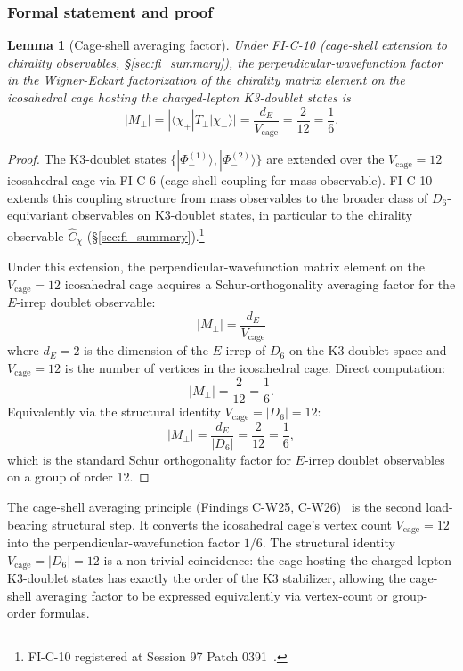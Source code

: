 \documentclass[11pt,letterpaper]{article}
\newtheorem{lemma}[theorem]{Lemma}
\newcommand{\Cchi}{\hat{C}_\chi}
\newcommand{\PhiminusOne}{|\Phi_-^{(1)}\rangle}
\newcommand{\PhiminusTwo}{|\Phi_-^{(2)}\rangle}
\newcommand{\Dsix}{D_6}
\begin{document}
\subsubsection{Formal statement and proof}\label{sec:cage_shell_factor_lemma}

\begin{lemma}[Cage-shell averaging factor]\label{lem:cage_shell}
Under FI-C-10 (cage-shell extension to chirality observables, \S\ref{sec:fi_summary}), the perpendicular-wavefunction factor in the Wigner-Eckart factorization of the chirality matrix element on the icosahedral cage hosting the charged-lepton K3-doublet states is
\[
|M_\perp| = |\langle \chi_+ | T_\perp | \chi_- \rangle| = \frac{d_E}{V_\text{cage}} = \frac{2}{12} = \frac{1}{6}.
\]
\end{lemma}

\begin{proof}
The K3-doublet states $\{\PhiminusOne, \PhiminusTwo\}$ are extended over the $V_\text{cage} = 12$ icosahedral cage via FI-C-6 (cage-shell coupling for mass observable). FI-C-10 extends this coupling structure from mass observables to the broader class of $D_6$-equivariant observables on K3-doublet states, in particular to the chirality observable $\Cchi$ (\S\ref{sec:fi_summary}).\footnote{FI-C-10 registered at Session 97 Patch 0391~\cite{abshier_capotauro_subclaim_c_sketch}.}

Under this extension, the perpendicular-wavefunction matrix element on the $V_\text{cage} = 12$ icosahedral cage acquires a Schur-orthogonality averaging factor for the $E$-irrep doublet observable:
\[
|M_\perp| = \frac{d_E}{V_\text{cage}}
\]
where $d_E = 2$ is the dimension of the $E$-irrep of $\Dsix$ on the K3-doublet space and $V_\text{cage} = 12$ is the number of vertices in the icosahedral cage. Direct computation:
\[
|M_\perp| = \frac{2}{12} = \frac{1}{6}.
\]
Equivalently via the structural identity $V_\text{cage} = |\Dsix| = 12$:
\[
|M_\perp| = \frac{d_E}{|\Dsix|} = \frac{2}{12} = \frac{1}{6},
\]
which is the standard Schur orthogonality factor for $E$-irrep doublet observables on a group of order 12.
\end{proof}

The cage-shell averaging principle (Findings C-W25, C-W26)~\cite{abshier_capotauro_subclaim_c_sketch} is the second load-bearing structural step. It converts the icosahedral cage's vertex count $V_\text{cage} = 12$ into the perpendicular-wavefunction factor $1/6$. The structural identity $V_\text{cage} = |\Dsix| = 12$ is a non-trivial coincidence: the cage hosting the charged-lepton K3-doublet states has exactly the order of the K3 stabilizer, allowing the cage-shell averaging factor to be expressed equivalently via vertex-count or group-order formulas.
\end{document}

